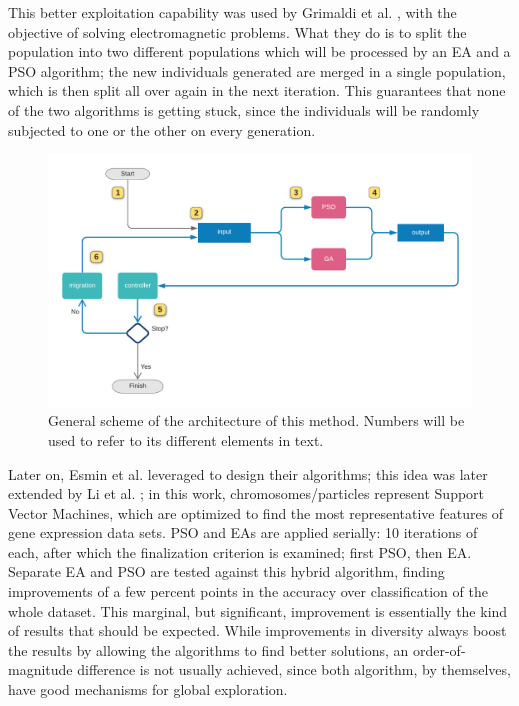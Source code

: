 \documentclass[runningheads]{llncs}
\begin{document}
This better exploitation capability was used by Grimaldi et al.
\cite{grimaldi2005genetical}, with the objective of solving electromagnetic problems. What they do is
to split the population into two different populations which will be
processed by an EA and a PSO algorithm; the new individuals generated
are merged in a single population, which is then split all over again
in the next iteration. This guarantees that none of the two algorithms
is getting stuck, since the individuals will be randomly subjected to
one or the other on every generation.


\begin{figure}[h!tb]
\includegraphics[width=5in]{../images/kafkeo}
\caption{General scheme of the architecture of this method. Numbers will be used to refer to its different elements in text.}
\label{fig:kafkeo}
\end{figure}
%
Later on, Esmin et al. \cite{esmin2006hybrid} leveraged to design their
algorithms; this idea was
later extended by Li et al. \cite{li2008gene}; in this work,
chromosomes/particles represent Support Vector Machines, which are
optimized to find the most representative features of gene expression
data sets. PSO and EAs are applied serially: 10 iterations of each,
after which the finalization criterion is examined; first PSO, then
EA. Separate EA and PSO are tested against this hybrid algorithm,
finding improvements of a few percent points in the accuracy over
classification of the whole dataset. This marginal, but significant,
improvement is essentially the kind of results that should be
expected. While improvements in diversity always boost the results by
allowing the algorithms to find better solutions, an
order-of-magnitude difference is not usually  achieved, since both
algorithm, by themselves, have good mechanisms for global
exploration.
\end{document}
